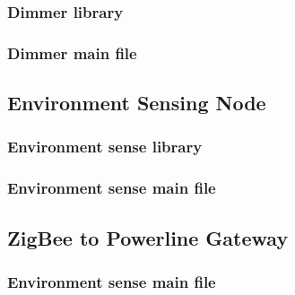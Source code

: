 \subsubsection{Dimmer library}



\subsubsection{Dimmer main file}


\pagebreak

\subsection{Environment Sensing Node}
\label{an:environment-code}

\subsubsection{Environment sense library}



\subsubsection{Environment sense main file}


\pagebreak

\subsection{ZigBee to Powerline Gateway}
\label{an:gateway-code}

\subsubsection{Environment sense main file}


\pagebreak





